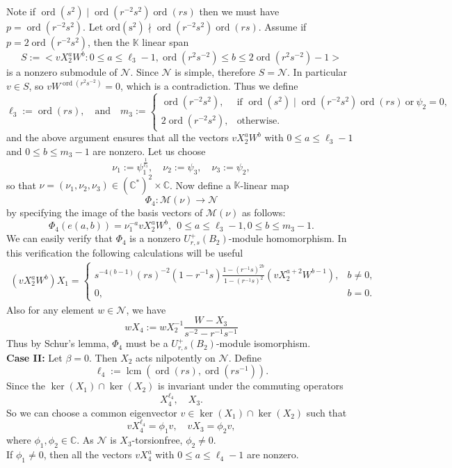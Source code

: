 \documentclass[12 pt,reqno]{amsart}
\numberwithin{equation}{section}
\DeclareMathOperator{\ord}{ord}
\theoremstyle{definition}
\theoremstyle{definition}
\theoremstyle{remark}
\theoremstyle{remark}
\begin{document}
\noindent Note if $\ord(s^2) \mid \ord(r^{-2}s^2) \ord(rs)$ then we must have $p=\ord(r^{-2}s^2)$. Let $\operatorname{ord(s^2)}\nmid \ord(r^{-2}s^2) \ord(rs)$. Assume if $p =2 \ord(r^{-2}s^2)$, then the $\mathbb{K}$ linear span \[S:=\big<vX_{2}^a{W}^b:0 \leq a \leq \ell_3-1, \ord(r^2s^{-2})\leq b \leq 2\ord(r^2s^{-2})-1\big>\] is a nonzero submodule of $\mathcal{N}$. Since $\mathcal{N}$ is simple, therefore $S=\mathcal{N}$. In particular $v\in S$, so $v{W}^{\ord(r^2s^{-2})}=0$, which is a contradiction. Thus we define $$
  \ell_3 := \ord(rs), \quad \text{and}\quad   m_3 := 
    \begin{cases}
        \ord(r^{-2}s^2), & \text{if } \ord(s^2) \mid \ord(r^{-2}s^2) \ord(rs)\ \text{or} \ \psi_2=0 , \\[5pt]
        2\ord(r^{-2}s^2), & \text{otherwise}.
    \end{cases}$$
    and the above argument ensures that all the vectors $vX_2^{a}{W}^{b}$ with $0 \leq a \leq \ell_3-1$ and $0 \leq b \leq m_3-1$ are nonzero. Let us choose
\[\nu_1:=\psi_1^{\frac{1}{\ell_3}},\quad  \nu_2:=\psi_3,\quad \nu_3:=\psi_2,\] so that 
$\nu=(\nu_1,\nu_2,\nu_3)\in {(\mathbb{C}^*)}^2 \times \mathbb{C}$.  Now define a $\mathbb{K}$-linear map \[\Phi_4:\mathcal{M}(\nu)\rightarrow \mathcal{N}\] by specifying the image of the basis vectors of $\mathcal{M}(\nu)$ as follows:
\[\Phi_4\left(e(a,b)\right)=\nu_1^{-a}vX_{2}^a{W}^b,\ \ 0\leq a\leq \ell_3-1, 0 \leq b \leq m_3-1.\] We can easily verify that $\Phi_4$ is a nonzero $U_{r,s}^+(B_2)$-module homomorphism. In this verification the following calculations will be useful
\begin{align*}
    \left(vX_2^aW^b\right)X_1=\begin{cases}
        s^{-4(b-1)}(rs)^{-2} (1 - r^{-1}s)  
           \displaystyle \frac{1 - (r^{-1}s)^{2b}}{1 - (r^{-1}s)^2}(vX_2^{a+2}W^{b-1}), &  b\neq 0,\\
        0, & b=0.
    \end{cases}
\end{align*}
Also for any element $w \in \mathcal{N}$, we have 
\[wX_4:=wX_2^{-1}\frac{W-X_3}{s^{-2}-r^{-1}s^{-1}}\] Thus by Schur's lemma, $\Phi_4$ must be a $U_{r,s}^+(B_2)$-module isomorphism.\\
\textbf{Case II:} Let $\beta=0$. Then $X_2$ acts nilpotently on $\mathcal{N}$. Define 
\[\ell_4:= \operatorname{lcm} \left(\ord(rs), \ord(rs^{-1})\right).\]
Since the $\ker(X_1) \cap \ker (X_2)$ is invariant under the commuting operators \[X_4^{\ell_4}, \quad X_3.\] So we can choose a common eigenvector $v \in \ker(X_1) \cap \ker (X_2)$ such that 
\[vX_4^{\ell_4}=\phi_1 v, \quad vX_3=\phi_2 v,\] where $\phi_1, \phi_2 \in \mathbb{C}$. As $\mathcal{N}$ is $X_3$-torsionfree, $\phi_2 \neq 0$.\\
If $\phi_1 \neq 0$, then all the vectors $vX_4^a$ with $0 \leq a \leq \ell_4-1$ are nonzero. 
\end{document}

